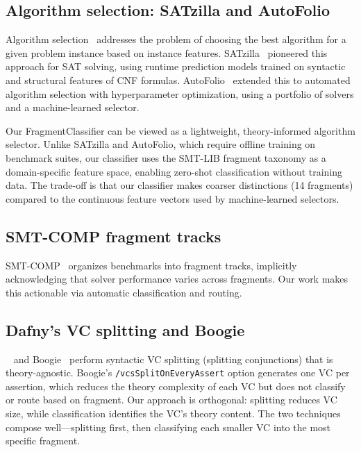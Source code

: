 \documentclass[11pt]{article}
\begin{document}
\subsection{Algorithm selection: SATzilla and AutoFolio}

Algorithm selection~\cite{portfolio} addresses the problem of
choosing the best algorithm for a given problem instance
based on instance features.  SATzilla~\cite{satzilla}
pioneered this approach for SAT solving, using runtime
prediction models trained on syntactic and structural
features of CNF formulas.  AutoFolio~\cite{autofolio}
extended this to automated algorithm selection with
hyperparameter optimization, using a portfolio of solvers
and a machine-learned selector.

Our FragmentClassifier can be viewed as a lightweight,
theory-informed algorithm selector.  Unlike SATzilla
and AutoFolio, which require offline training on
benchmark suites, our classifier uses the SMT-LIB
fragment taxonomy as a domain-specific feature space,
enabling zero-shot classification without training data.
The trade-off is that our classifier makes coarser
distinctions (14 fragments) compared to the continuous
feature vectors used by machine-learned selectors.

\subsection{SMT-COMP fragment tracks}

SMT-COMP~\cite{smtcomp} organizes benchmarks into fragment tracks,
implicitly acknowledging that solver performance varies across
fragments.  Our work makes this actionable via automatic
classification and routing.

\subsection{Dafny's VC splitting and Boogie}

\Dafny{}~\cite{dafny} and Boogie~\cite{boogie} perform syntactic
VC splitting (splitting conjunctions) that is theory-agnostic.
Boogie's \texttt{/vcsSplitOnEveryAssert} option generates one
VC per assertion, which reduces the theory complexity of each
VC but does not classify or route based on fragment.
Our approach is orthogonal: splitting reduces VC size, while
classification identifies the VC's theory content.  The two
techniques compose well---splitting first, then classifying
each smaller VC into the most specific fragment.
\end{document}
